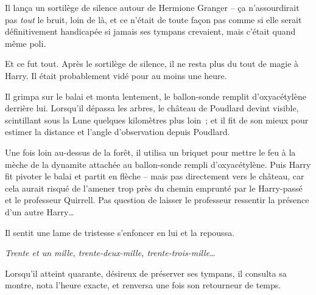 Il lança un sortilège de silence autour de Hermione Granger -- ça n'assourdirait pas \emph{tout} le bruit, loin de là, et ce n'était de toute façon pas comme si elle serait définitivement handicapée si jamais ses tympans crevaient, mais c'était quand même poli.

Et ce fut tout.
Après le sortilège de silence, il ne resta plus du tout de magie à Harry.
Il était probablement vidé pour au moins une heure.

Il grimpa sur le balai et monta lentement, le ballon-sonde remplit d'oxyacétylène derrière lui.
Lorsqu'il dépassa les arbres, le château de Poudlard devint visible, scintillant sous la Lune quelques kilomètres plus loin~; et il fit de son mieux pour estimer la distance et l'angle d'observation depuis Poudlard.

Une fois loin au-dessus de la forêt, il utilisa un briquet pour mettre le feu à la mèche de la dynamite attachée au ballon-sonde rempli d'oxyacétylène.
Puis Harry fit pivoter le balai et partit en flèche -- mais pas directement vers le château, car cela aurait risqué de l'amener trop près du chemin emprunté par le Harry-passé et le professeur Quirrell.
Pas question de laisser le professeur ressentir la présence d'un autre Harry…

Il sentit une lame de tristesse s'enfoncer en lui et la repoussa.

\emph{Trente et un mille, trente-deux-mille, trente-trois-mille…}

Lorsqu'il atteint quarante, désireux de préserver ses tympans, il consulta sa montre, nota l'heure exacte, et renversa une fois son retourneur de temps.
